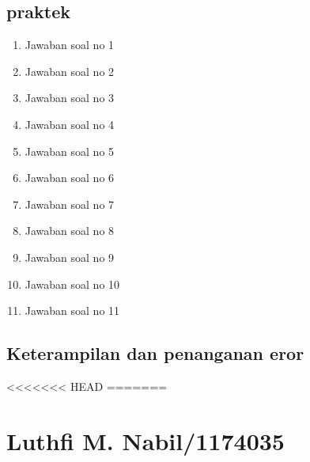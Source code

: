 \subsection{praktek}
\begin{enumerate}
    \item Jawaban soal no 1
    
    \item Jawaban soal no 2
    
    \item Jawaban soal no 3
    
    \item Jawaban soal no 4
    
    \item Jawaban soal no 5
    
    \item Jawaban soal no 6
    
    \item Jawaban soal no 7
    
    \item Jawaban soal no 8
    
    \item Jawaban soal no 9
    
    \item Jawaban soal no 10
    
    \item Jawaban soal no 11
    
\end{enumerate}

\subsection{Keterampilan dan penanganan eror}
    

<<<<<<< HEAD
=======


\section{Luthfi M. Nabil/1174035}
